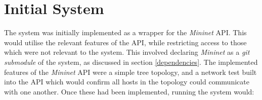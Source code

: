 













%
%
%
%
%
%
%
%
%

\section{Initial System}
\label{initial_system}
The system was initially implemented as a wrapper for the \textit{Mininet} API.
This would utilise the relevant features of the API, while restricting access to those which were not relevant to the system.
This involved declaring \textit{Mininet} as a \textit{git submodule} of the system, as discussed in section \ref{dependencies}.
The implemented features of the \textit{Mininet} API were a simple tree topology, and a network test built into the API which would confirm all hosts in the topology could communicate with one another.
Once these had been implemented, running the system would:

